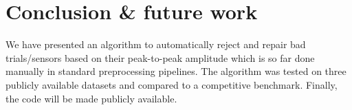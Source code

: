 \section{Conclusion \& future work}
\label{sec:conclusion}
We have presented an algorithm to automatically reject and repair bad trials/sensors based on their peak-to-peak amplitude which is so far done manually in standard preprocessing pipelines. The algorithm was tested on three publicly available datasets and compared to a competitive benchmark. Finally, the code will be made publicly available.
